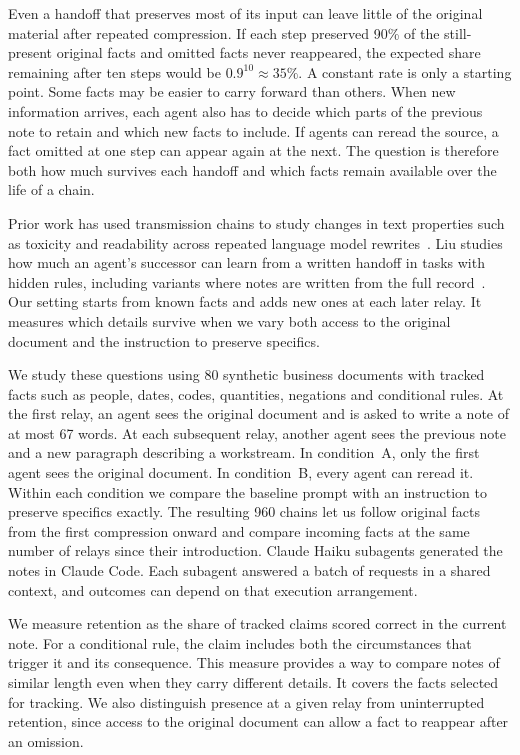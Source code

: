 \documentclass[10pt,letterpaper]{amsart}
\numberwithin{equation}{section}
\begin{document}
Even a handoff that preserves most of its input can leave little of the original material
after repeated compression. If each step preserved 90\% of the still-present original
facts and omitted facts never reappeared, the expected share remaining after ten steps
would be $0.9^{10}\approx 35\%$. A constant rate is only a starting point. Some facts may
be easier to carry forward than others. When new information arrives, each agent also
has to decide which parts of the previous note to retain and which new facts to include.
If agents can reread the source, a fact omitted at one step can appear again at the next.
The question is therefore both how much survives each handoff and which facts remain
available over the life of a chain.

Prior work has used transmission chains to study changes in text properties such as
toxicity and readability across repeated language model rewrites~\cite{perezEtAl2025}.
Liu studies how much an agent's successor can learn from a written handoff in tasks
with hidden rules, including variants where notes are written from the full
record~\cite{yiboLiu2026Handover}. Our setting starts from known facts and adds new ones
at each later relay. It measures which details survive when we vary both access to the
original document and the instruction to preserve specifics.

We study these questions using 80 synthetic business documents with tracked facts such
as people, dates, codes, quantities, negations and conditional rules. At the first relay,
an agent sees the original document and is asked to write a note of at most 67 words.
At each subsequent relay, another agent sees the previous note and a new paragraph
describing a workstream. In condition~A, only the first agent sees the original
document. In condition~B, every agent can reread it. Within each condition we compare
the baseline prompt with an instruction to preserve specifics exactly. The resulting
960 chains let us follow original facts from the first compression onward and compare
incoming facts at the same number of relays since their introduction. Claude Haiku
subagents generated the notes in Claude Code. Each subagent answered a batch of requests
in a shared context, and outcomes can depend on that execution arrangement.

We measure retention as the share of tracked claims scored correct in the current note.
For a conditional rule, the claim includes both the circumstances that trigger it and
its consequence. This measure provides a way to compare notes of similar length even
when they carry different details. It covers the facts selected for tracking. We also
distinguish presence at a given relay from uninterrupted retention, since access to the
original document can allow a fact to reappear after an omission.
\end{document}
